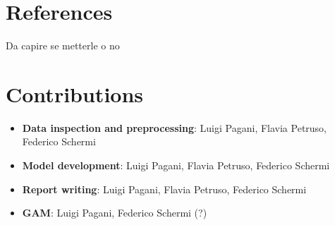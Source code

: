 \documentclass[conference,compsoc,11pt]{IEEEtran} %
\begin{document}
\section{References}
\vspace{-0.3cm}

Da capire se metterle o no

\section{Contributions}
\vspace{-0.3cm}
\begin {itemize}
	\item {\textbf{Data inspection and preprocessing}}: Luigi Pagani, Flavia Petruso, Federico Schermi
	\item  {\textbf{Model development}}: Luigi Pagani, Flavia Petruso, Federico Schermi
	\item  {\textbf{Report writing}}: Luigi Pagani, Flavia Petruso, Federico Schermi
	\item  {\textbf{GAM}}: Luigi Pagani, Federico Schermi (?)
\end {itemize}
\end{document}
